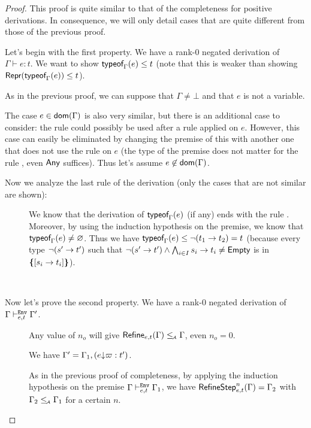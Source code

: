 \documentclass[a4paper]{article}
\theoremstyle{definition}
\begin{document}
  \begin{proof}
    This proof is quite similar to that of the completeness for positive derivations.
    In consequence, we will only detail cases that are quite different from those of the previous proof.

    Let's begin with the first property. We have a rank-0 negated derivation of $\Gamma \vdash e:t$.
    We want to show $\textsf{typeof}_{\Gamma}(e) \leq t$ (note that this is weaker than showing $\textsf{Repr}(\textsf{typeof}_{\Gamma}(e)) \leq t$).

    As in the previous proof, we can suppose that $\Gamma \neq \bot$ and that $e$ is not a variable.

    The case $e\in\textsf{dom}(\Gamma)$ is also very similar, but there is an additional case to consider:
    the rule  could possibly be used after a rule  applied on $e$.
    However, this case can easily be eliminated by changing the premise of this  with another one
    that does not use the rule  on $e$ (the type of the premise does not matter for the rule ,
    even $\textsf{Any}$ suffices). Thus let's assume $e\not\in\textsf{dom}(\Gamma)$.

    Now we analyze the last rule of the derivation (only the cases that are not similar are shown):
    \begin{description}
      \item[] We know that the derivation of $\textsf{typeof}_{\Gamma}(e)$ (if any) ends with the rule .
      Moreover, by using the induction hypothesis on the premise, we know that $\textsf{typeof}_{\Gamma}(e) \neq \varnothing$.
      Thus we have $\textsf{typeof}_{\Gamma}(e) \leq \neg (t_1\to t_2) = t$ (because every type $\neg (s'\to t')$
      such that $\neg (s'\to t') \land \bigwedge_{i\in I} s_i\to t_i \neq \textsf{Empty}$ is in $\textbf{\textup{\{}}{[}s_i\to t_i]\textbf{\textup{\}}}$).
    \end{description}

    \ 

    Now let's prove the second property. We have a rank-0 negated derivation of $\Gamma \vdash^{\texttt{Env}}_{e,t} \Gamma'$.

    \begin{description}
      \item[] Any value of $n_o$ will give $\textsf{Refine}_{e,t}(\Gamma) \leq_{\!\scriptscriptstyle\mathcal{A}} \Gamma$, even $n_o = 0$.
      \item[] We have $\Gamma' = \Gamma_1,(e{\downarrow}\varpi:t')$.
       
      As in the previous proof of completeness,
      by applying the induction hypothesis on the premise $\Gamma \vdash^{\texttt{Env}}_{e,t} \Gamma_1$, we have
      $\textsf{RefineStep}_{e,t}^n (\Gamma) = \Gamma_2$ with $\Gamma_2 \leq_{\!\scriptscriptstyle\mathcal{A}} \Gamma_1$ for a certain $n$.


\end{description}
\end{proof}
\end{document}
